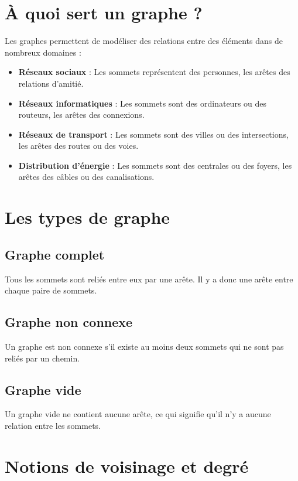 \documentclass[10pt,a4paper]{article}
\begin{document}
\section*{À quoi sert un graphe ?}

Les graphes permettent de modéliser des relations entre des éléments dans de nombreux domaines :
\begin{itemize}
    \item \textbf{Réseaux sociaux} : Les sommets représentent des personnes, les arêtes des relations d'amitié.
    \item \textbf{Réseaux informatiques} : Les sommets sont des ordinateurs ou des routeurs, les arêtes des connexions.
    \item \textbf{Réseaux de transport} : Les sommets sont des villes ou des intersections, les arêtes des routes ou des voies.
    \item \textbf{Distribution d'énergie} : Les sommets sont des centrales ou des foyers, les arêtes des câbles ou des canalisations.
\end{itemize}

\section*{Les types de graphe}

\subsection*{Graphe complet}
Tous les sommets sont reliés entre eux par une arête. Il y a donc une arête entre chaque paire de sommets.

\subsection*{Graphe non connexe}
Un graphe est non connexe s'il existe au moins deux sommets qui ne sont pas reliés par un chemin.

\subsection*{Graphe vide}
Un graphe vide ne contient aucune arête, ce qui signifie qu'il n'y a aucune relation entre les sommets.

\section*{Notions de voisinage et degré}
\end{document}
